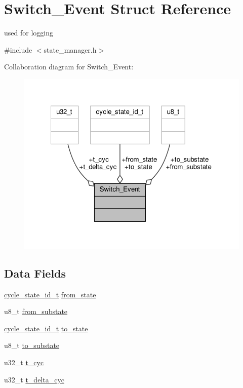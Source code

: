 \hypertarget{struct_switch___event}{}\section{Switch\+\_\+\+Event Struct Reference}
\label{struct_switch___event}


used for logging  




{\ttfamily \#include $<$state\+\_\+manager.\+h$>$}



Collaboration diagram for Switch\+\_\+\+Event\+:\nopagebreak
\begin{figure}[H]
\begin{center}
\leavevmode
\includegraphics[width=322pt]{struct_switch___event__coll__graph}
\end{center}
\end{figure}
\subsection*{Data Fields}
\begin{DoxyCompactItemize}
\item 
\hyperlink{states_8h_a9e0ef0bc98a491d55216d9485e562252}{cycle\+\_\+state\+\_\+id\+\_\+t} \hyperlink{struct_switch___event_ace1ca449cf2a638ada4496a6b7da085d}{from\+\_\+state}
\item 
u8\+\_\+t \hyperlink{struct_switch___event_a5b0b04739f68235a7b47f885c9c2729c}{from\+\_\+substate}
\item 
\hyperlink{states_8h_a9e0ef0bc98a491d55216d9485e562252}{cycle\+\_\+state\+\_\+id\+\_\+t} \hyperlink{struct_switch___event_a48cd62cc43f9cdfa13c1408cc8362314}{to\+\_\+state}
\item 
u8\+\_\+t \hyperlink{struct_switch___event_a40d445d8ea44c266a788ea380c052dda}{to\+\_\+substate}
\item 
u32\+\_\+t \hyperlink{struct_switch___event_afbbb65d718c9c58242b9147bcd44bd33}{t\+\_\+cyc}
\item 
u32\+\_\+t \hyperlink{struct_switch___event_abdc682e95d705691997e7d6b8c5a4d47}{t\+\_\+delta\+\_\+cyc}
\end{DoxyCompactItemize}


